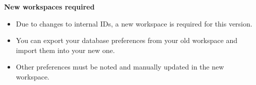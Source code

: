 \textbf{New workspaces required}\\
\begin{itemize}
\item Due to changes to internal IDs, a new workspace is required for this version. 
\item You can export your database preferences from your old workspace and import them into your new one. 
\item Other preferences must be noted and manually updated in the new workspace. 
\end{itemize}

